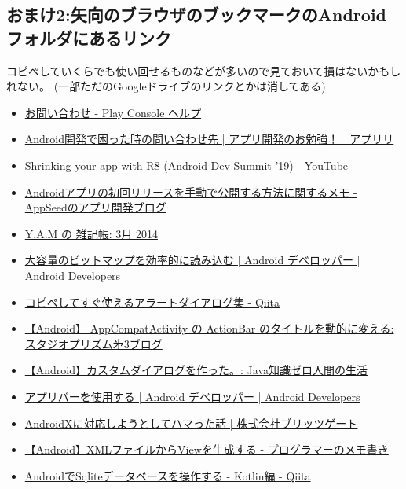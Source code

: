 \documentclass[a4paper]{ltjsreport}
\newcommand{\link}[2]{\href{#2}{#1}}
\begin{document}
\subsection{おまけ2:矢向のブラウザのブックマークのAndroidフォルダにあるリンク}
コピペしていくらでも使い回せるものなどが多いので見ておいて損はないかもしれない。
(一部ただのGoogleドライブのリンクとかは消してある)
\begin{itemize}
  \item \link{お問い合わせ - Play Console ヘルプ}{https://support.google.com/googleplay/android-developer/gethelp?hl=ja\&visit\_id=637678981545128687-2809304254\&rd=1\#}
  \item \link{Android開発で困った時の問い合わせ先 | アプリ開発のお勉強！　アプリリ}{https://bit.ly/3on3bmL}
  \item \link{Shrinking your app with R8 (Android Dev Summit '19) - YouTube}{https://www.youtube.com/watch?v=uQ_yK8kRCaA}
  \item \link{Androidアプリの初回リリースを手動で公開する方法に関するメモ - AppSeedのアプリ開発ブログ}{https://develop.hateblo.jp/entry/google-play-manual-release}
  \item \link{Y.A.M の 雑記帳: 3月 2014}{http://y-anz-m.blogspot.com/2014/03/}
  \item \link{大容量のビットマップを効率的に読み込む  |  Android デベロッパー  |  Android Developers}{https://developer.android.com/topic/performance/graphics/load-bitmap?hl=ja}
  \item \link{コピペしてすぐ使えるアラートダイアログ集 - Qiita}{https://qiita.com/suzukihr/items/8973527ebb8bb35f6bb8}
  \item \link{【Android】 AppCompatActivity の ActionBar のタイトルを動的に変える: スタジオプリズム㐧3ブログ}{http://s-prism3.seesaa.net/article/438905821.html}
  \item \link{【Android】カスタムダイアログを作った。: Java知識ゼロ人間の生活}{http://stren-blog.seesaa.net/article/367038846.html}
  \item \link{アプリバーを使用する  |  Android デベロッパー  |  Android Developers}{https://developer.android.com/guide/fragments/appbar?hl=ja}
  \item \link{AndroidXに対応しようとしてハマった話 | 株式会社ブリッツゲート}{https://blitzgate.co.jp/blog/2350/}
  \item \link{【Android】XMLファイルからViewを生成する - プログラマーのメモ書き}{https://bit.ly/3wDqZq9}
  \item \link{AndroidでSqliteデータベースを操作する - Kotlin編 - Qiita}{https://qiita.com/NaoSekig/items/0d95d631378040c1961a}

\end{itemize}
\end{document}
